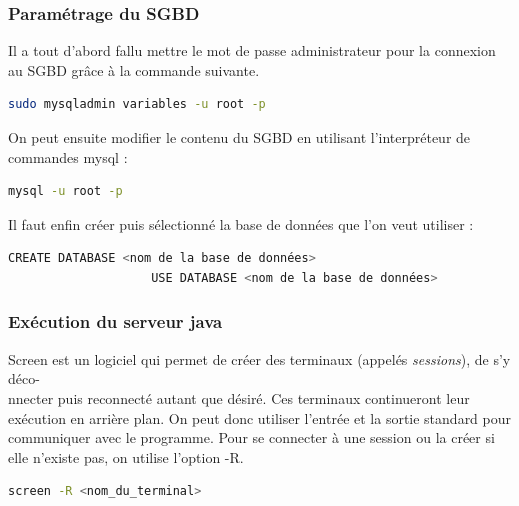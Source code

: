 \documentclass[a4paper, 12pt]{report}
\begin{document}
		\subsubsection{Paramétrage du SGBD}
			Il a tout d'abord fallu mettre le mot de passe administrateur pour la connexion au SGBD grâce à la commande suivante.
			\begin{mdframed}[backgroundcolor=light-gray, roundcorner=20pt,
				leftmargin=0, rightmargin=0, 
				innerleftmargin=20, linecolor=darkgray]
				\begin{lstlisting}[language=bash]
					sudo mysqladmin variables -u root -p
				\end{lstlisting}
			\end{mdframed}
			On peut ensuite modifier le contenu du SGBD en utilisant l'interpréteur de commandes mysql :
			\par
			\begin{mdframed}[backgroundcolor=light-gray, roundcorner=20pt,
				leftmargin=0, rightmargin=0, 
				innerleftmargin=20, linecolor=darkgray]
				\begin{lstlisting}[language=bash]
					mysql -u root -p
				\end{lstlisting}
			\end{mdframed}
			Il faut enfin créer puis sélectionné la base de données que l'on veut utiliser :
			\begin{mdframed}[backgroundcolor=light-gray, roundcorner=20pt,
				leftmargin=0, rightmargin=0, 
				innerleftmargin=20, linecolor=darkgray]
				\begin{lstlisting}[language=bash]
					CREATE DATABASE <nom de la base de données>
					USE DATABASE <nom de la base de données>
				\end{lstlisting}
			\end{mdframed}
		\subsubsection{Exécution du serveur java}
			Screen est un logiciel qui permet de créer des terminaux (appelés \emph{sessions}), de s'y déco-\\nnecter puis reconnecté autant que désiré.
			Ces terminaux continueront leur exécution en arrière plan. On peut donc utiliser l'entrée et la sortie standard pour communiquer avec le programme.
			Pour se connecter à une session ou la créer si elle n'existe pas, on utilise l'option -R.
			\begin{mdframed}[backgroundcolor=light-gray, roundcorner=20pt,
				leftmargin=0, rightmargin=0, 
				innerleftmargin=20, linecolor=darkgray]
				\begin{lstlisting}[language=bash]
					screen -R <nom_du_terminal>
				\end{lstlisting}
			\end{mdframed}
\end{document}

